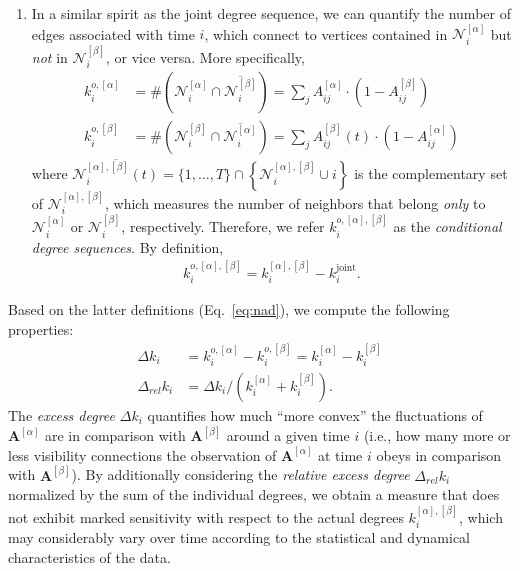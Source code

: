 \begin{enumerate}
\item In a similar spirit as the joint degree sequence, we can quantify the number of edges associated with time $i$, which connect to vertices contained in $\mathcal{N}_i^{{[\alpha]}}$ but \textit{not} in $\mathcal{N}_i^{{[\beta]}}$, or vice versa. More specifically,
\begin{align}
k_i^{{o,[\alpha]}} & = \# \left( \mathcal{N}_i^{{[\alpha]}} \cap \overline{\mathcal{N}_i^{{[\beta]}}} \right)  =  \sum_{j} A_{ij}^{{[\alpha]}}\cdot \left( 1-A_{ij}^{{[\beta]}} \right) \\
k_i^{{o,[\beta]}} & = \# \left( \mathcal{N}_i^{{[\beta]}} \cap \overline{\mathcal{N}_i^{{[\alpha]}}} \right) = \sum_{j} A_{ij}^{{[\beta]}}(t)\cdot \left(1-A_{ij}^{{[\alpha]}} \right)
\end{align}
where $\overline{\mathcal{N}_i^{{[\alpha]}, {[\beta]}}(t)}=\{1,\ldots,T\}\cap \left\{ \mathcal{N}_i^{{[\alpha]}, {[\beta]}}\cup i\right\}$ is the complementary set of $\mathcal{N}_i^{{[\alpha]}, {[\beta]}}$, which measures the number of neighbors that belong \textit{only} to $\mathcal{N}_i^{{[\alpha]}}$ or $\mathcal{N}_i^{{[\beta]}}$, respectively. Therefore, we refer $k_i^{o,{[\alpha]}, {[\beta]}}$ as the \textit{conditional degree sequences}. By definition,
\begin{align}\label{eq:nad}
k_i^{o,{[\alpha]}, {[\beta]}}=k_i^{{[\alpha]}, {[\beta]}}-k_i^\textrm{joint}.
\end{align}
\end{enumerate}

Based on the latter definitions (Eq.~\ref{eq:nad}), we compute the following properties:
\begin{align} \label{eq:deltaK}
\Delta k_i &= k_i^{o,{[\alpha]}} - k_i^{o,{[\beta]}} = k_i^{{[\alpha]}} - k_i^{{[\beta]}} \\ \label{eq:deltaReK}
\Delta_{rel} k_i &= \Delta k_i/\left(k_i^{{[\alpha]}} + k_i^{{[\beta]}} \right).
\end{align}
The \textit{excess degree} $\Delta k_i$ quantifies how much ``more convex'' the fluctuations of $\mathbf{A}^{[\alpha]}$ are in comparison with $\mathbf{A}^{[\beta]}$ around a given time $i$ (i.e., how many more or less visibility connections the observation of $\mathbf{A}^{[\alpha]}$ at time $i$ obeys in comparison with $\mathbf{A}^{[\beta]}$). By additionally considering the \textit{relative excess degree} $\Delta_{rel} k_i$ normalized by the sum of the individual degrees, we obtain a measure that does not exhibit marked sensitivity with respect to the actual degrees $k_i^{{[\alpha]}, {[\beta]}}$, which may considerably vary over time according to the statistical and dynamical characteristics of the data.


